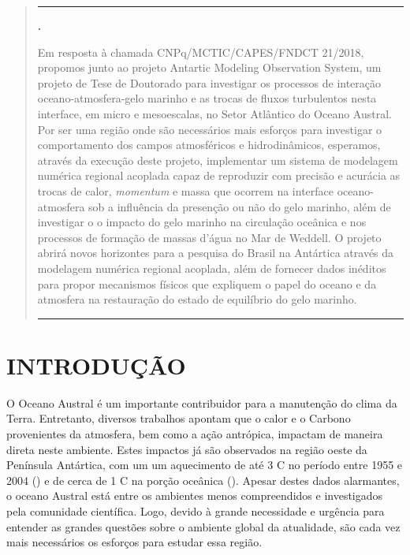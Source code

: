 \documentclass{article}
\begin{document}
\hypersetup{hidelinks}
\linespread{1}
\tableofcontents{}
\clearpage
\linespread{1.5}

\renewenvironment{abstract}
{\begin{quote}
\noindent \rule{\linewidth}{.5pt}\par{\bfseries \abstractname.}}
{\medskip\noindent \rule{\linewidth}{.5pt}
\end{quote}
}

\begin{abstract}\setcounter{page}{1}
Em resposta à chamada CNPq/MCTIC/CAPES/FNDCT 21/2018, propomos  junto ao projeto Antartic Modeling Observation System, um projeto 
de Tese de Doutorado para investigar os processos de interação oceano-atmosfera-gelo marinho e as 
trocas de fluxos turbulentos nesta interface, em micro e mesoescalas, no Setor Atlântico do Oceano Austral. Por ser uma região
onde são necessários mais esforços para investigar o comportamento dos campos atmosféricos e hidrodinâmicos, esperamos, através
da execução deste projeto, implementar um sistema de modelagem numérica regional acoplada capaz de reproduzir com precisão e acurácia
as trocas de calor, \textit{momentum} e massa que ocorrem na interface oceano-atmosfera sob a influência da presenção ou não do gelo marinho, além
de investigar o o impacto do gelo marinho na circulação oceânica e nos processos de formação de massas d'água no Mar de Weddell. O projeto 
abrirá novos horizontes para a pesquisa do Brasil na Antártica através da modelagem numérica regional acoplada, além de fornecer dados inéditos
para propor mecanismos físicos que expliquem o papel do oceano e da atmosfera na restauração do estado de equilíbrio do gelo marinho.

\end{abstract}

\section{INTRODUÇÃO}
 \bigskip

O Oceano Austral é um importante contribuidor para a manutenção do clima da Terra. Entretanto, diversos trabalhos
apontam que o calor e o Carbono provenientes da atmosfera, bem como a ação antrópica, impactam de maneira direta neste 
ambiente. Estes impactos já são observados na região oeste da Península Antártica, com um um aquecimento de até 3 \textdegree{}C no período entre 1955 e 2004 (\cite{Turner2005})
e de cerca de 1 \textdegree{}C na porção oceânica (\cite{Meredith2015}). Apesar destes dados alarmantes, o oceano 
Austral está entre os ambientes menos compreendidos e investigados pela comunidade científica. 
Logo, devido à grande necessidade e urgência para entender as  grandes questões sobre o ambiente global da atualidade, 
são cada vez mais necessários os esforços para estudar essa região.
\end{document}
